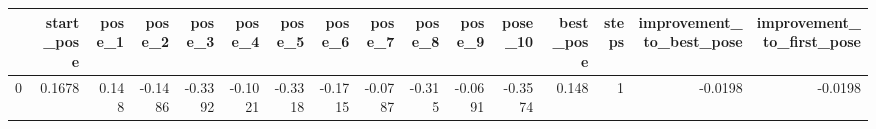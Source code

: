 \begin{tabular}{lrrrrrrrrrrrrrrr}
\toprule
{} &  start\_pose &  pose\_1 &  pose\_2 &  pose\_3 &  pose\_4 &  pose\_5 &  pose\_6 &  pose\_7 &  pose\_8 &  pose\_9 &  pose\_10 &  best\_pose &  steps &  improvement\_to\_best\_pose &  improvement\_to\_first\_pose \\
\midrule
0 &      0.1678 &   0.148 & -0.1486 & -0.3392 & -0.1021 & -0.3318 & -0.1715 & -0.0787 &  -0.315 & -0.0691 &  -0.3574 &      0.148 &      1 &                   -0.0198 &                    -0.0198 \\
\bottomrule
\end{tabular}
